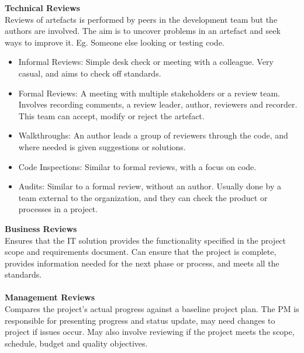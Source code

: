 \documentclass[a4paper,10pt]{article}
\begin{document}
\textcolor{BlueGreen}{\textbf{Technical Reviews}} \\
Reviews of artefacts is performed by peers in the development team but the authors are involved. The aim is to uncover problems in an artefact and seek ways to improve it. Eg. Someone else looking or testing code. 
\begin{itemize}
	\item Informal Reviews: Simple desk check or meeting with a colleague. Very casual, and aims to check off standards. 
	\item Formal Reviews: A meeting with multiple stakeholders or a review team. Involves recording comments, a review leader, author, reviewers and recorder. This team can accept, modify or reject the artefact. 
	\item Walkthroughs: An author leads a group of reviewers through the code, and where needed is given suggestions or solutions. 
	\item Code Inspections: Similar to formal reviews, with a focus on code. 
	\item Audits: Similar to a formal review, without an author. Usually done by a team external to the organization, and they can check the product or processes in a project.  
\end{itemize}
\textcolor{BlueGreen}{\textbf{Business Reviews}} \\
Ensures that the IT solution provides the functionality specified in the project scope and requirements document. Can ensure that the project is complete, provides information needed for the next phase or process, and meets all the standards. \\\\
\textcolor{BlueGreen}{\textbf{Management Reviews}} \\
Compares the project's actual progress against a baseline project plan. The PM is responsible for presenting progress and status update, may need changes to project if issues occur. May also involve reviewing if the project meets the scope, schedule, budget and quality objectives. \\\\
\newpage
\end{document}
